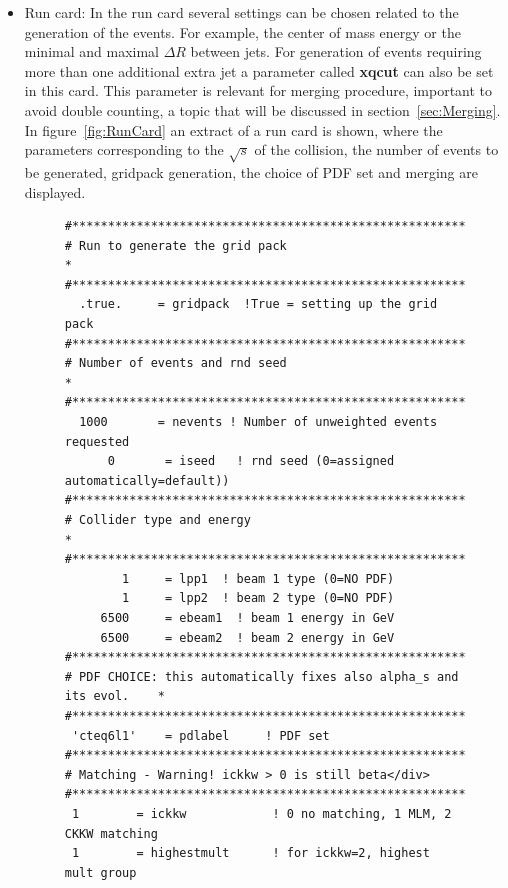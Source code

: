 \begin{itemize}
\begin{itemize}
  \item Run card: In the run card several settings can be chosen related to the generation of the events. For example, the center of mass energy or the minimal and maximal $\Delta R$ between jets. For generation of events requiring more than one additional extra jet a parameter called \textbf{xqcut} can also be set in this card. This parameter is relevant for merging procedure, important to avoid double counting, a topic that will be discussed in section~\ref{sec:Merging}. In figure~\ref{fig:RunCard} an extract of a run card is shown, where the parameters corresponding to the $\sqrt{s}$ of the collision, the number of events to be generated, gridpack generation, the choice of PDF set and merging are displayed.
    \begin{figure}[!Hhtbp]
      \begin{center}
        \begin{minipage}[c]{0.7\textwidth}
\scriptsize
\begin{verbatim}
#*********************************************************************
# Run to generate the grid pack                                      *
#*********************************************************************
  .true.     = gridpack  !True = setting up the grid pack
#*********************************************************************
# Number of events and rnd seed                                      *
#*********************************************************************
  1000       = nevents ! Number of unweighted events requested 
      0       = iseed   ! rnd seed (0=assigned automatically=default))
#*********************************************************************
# Collider type and energy                                           *
#*********************************************************************
        1     = lpp1  ! beam 1 type (0=NO PDF)
        1     = lpp2  ! beam 2 type (0=NO PDF)
     6500     = ebeam1  ! beam 1 energy in GeV
     6500     = ebeam2  ! beam 2 energy in GeV
#*********************************************************************
# PDF CHOICE: this automatically fixes also alpha_s and its evol.    *
#*********************************************************************
 'cteq6l1'    = pdlabel     ! PDF set  
#*********************************************************************
# Matching - Warning! ickkw > 0 is still beta</div>
#*********************************************************************
 1        = ickkw            ! 0 no matching, 1 MLM, 2 CKKW matching
 1        = highestmult      ! for ickkw=2, highest mult group

\end{verbatim}
\end{minipage}
\end{center}
\end{figure}
\end{itemize}
\end{itemize}
